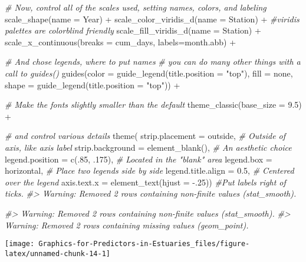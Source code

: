 \documentclass[
]{article}
\newenvironment{Shaded}{\begin{snugshade}}{\end{snugshade}}
\newcommand{\AttributeTok}[1]{\textcolor[rgb]{0.77,0.63,0.00}{#1}}
\newcommand{\CommentTok}[1]{\textcolor[rgb]{0.56,0.35,0.01}{\textit{#1}}}
\newcommand{\DecValTok}[1]{\textcolor[rgb]{0.00,0.00,0.81}{#1}}
\newcommand{\FloatTok}[1]{\textcolor[rgb]{0.00,0.00,0.81}{#1}}
\newcommand{\FunctionTok}[1]{\textcolor[rgb]{0.00,0.00,0.00}{#1}}
\newcommand{\NormalTok}[1]{#1}
\newcommand{\SpecialCharTok}[1]{\textcolor[rgb]{0.00,0.00,0.00}{#1}}
\newcommand{\StringTok}[1]{\textcolor[rgb]{0.31,0.60,0.02}{#1}}
\begin{document}
\begin{Shaded}
\begin{Highlighting}[]
  \CommentTok{\# Now, control all of the scales used, setting names, colors, and labeling}
  \FunctionTok{scale\_shape}\NormalTok{(}\AttributeTok{name =} \StringTok{\textquotesingle{}Year\textquotesingle{}}\NormalTok{) }\SpecialCharTok{+}
  \FunctionTok{scale\_color\_viridis\_d}\NormalTok{(}\AttributeTok{name =} \StringTok{\textquotesingle{}Station\textquotesingle{}}\NormalTok{) }\SpecialCharTok{+}  \CommentTok{\#viridis palettes are colorblind friendly}
  \FunctionTok{scale\_fill\_viridis\_d}\NormalTok{(}\AttributeTok{name =} \StringTok{\textquotesingle{}Station\textquotesingle{}}\NormalTok{) }\SpecialCharTok{+}
  \FunctionTok{scale\_x\_continuous}\NormalTok{(}\AttributeTok{breaks =}\NormalTok{ cum\_days, }\AttributeTok{labels=}\NormalTok{month.abb) }\SpecialCharTok{+}
  
  \CommentTok{\# And chose legends, where to put names}
  \CommentTok{\# you can do many other things with a call to \textasciigrave{}guides()\textasciigrave{}}
  \FunctionTok{guides}\NormalTok{(}\AttributeTok{color =} \FunctionTok{guide\_legend}\NormalTok{(}\AttributeTok{title.position =} \StringTok{"top"}\NormalTok{),}
         \AttributeTok{fill =} \StringTok{\textquotesingle{}none\textquotesingle{}}\NormalTok{,}
         \AttributeTok{shape =} \FunctionTok{guide\_legend}\NormalTok{(}\AttributeTok{title.position =} \StringTok{"top"}\NormalTok{)) }\SpecialCharTok{+}
  
  \CommentTok{\# Make the fonts slightly smaller than the default}
  \FunctionTok{theme\_classic}\NormalTok{(}\AttributeTok{base\_size =} \FloatTok{9.5}\NormalTok{) }\SpecialCharTok{+}
  
  \CommentTok{\# and control various details}
  \FunctionTok{theme}\NormalTok{( }\AttributeTok{strip.placement =} \StringTok{\textquotesingle{}outside\textquotesingle{}}\NormalTok{,         }\CommentTok{\# Outside of axis, like axis label}
         \AttributeTok{strip.background =} \FunctionTok{element\_blank}\NormalTok{(),  }\CommentTok{\# An aesthetic choice}
         \AttributeTok{legend.position =} \FunctionTok{c}\NormalTok{(.}\DecValTok{85}\NormalTok{, .}\DecValTok{175}\NormalTok{),      }\CommentTok{\# Located in the "blank" area}
         \AttributeTok{legend.box =} \StringTok{\textquotesingle{}horizontal\textquotesingle{}}\NormalTok{,           }\CommentTok{\# Place two legends side by side}
         \AttributeTok{legend.title.align =} \FloatTok{0.5}\NormalTok{,            }\CommentTok{\# Centered over the legend}
         \AttributeTok{axis.text.x =} \FunctionTok{element\_text}\NormalTok{(}\AttributeTok{hjust =} \SpecialCharTok{{-}}\NormalTok{.}\DecValTok{25}\NormalTok{))  }\CommentTok{\#Put labels right of ticks.}
\CommentTok{\#\textgreater{} Warning: Removed 2 rows containing non{-}finite values (stat\_smooth).}

\CommentTok{\#\textgreater{} Warning: Removed 2 rows containing non{-}finite values (stat\_smooth).}
\CommentTok{\#\textgreater{} Warning: Removed 2 rows containing missing values (geom\_point).}
\end{Highlighting}
\end{Shaded}

\begin{center}\texttt{[image: Graphics-for-Predictors-in-Estuaries\_files/figure-latex/unnamed-chunk-14-1]} \end{center}
\end{document}
